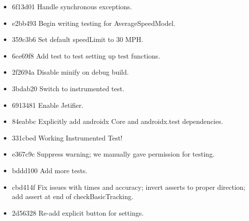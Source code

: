 \documentclass[11pt, a4paper, notitlepage]{report}
\begin{document}
\begin{itemize}
	\item 6f13d01 Handle synchronous exceptions. 
	\item e2bb493 Begin writing testing for AverageSpeedModel. 
	\item 359c3b6 Set default speedLimit to 30 MPH. 
	\item 6ce69f8 Add test to test setting up test functions. 
	\item 2f2694a Disable minify on debug build. 
	\item 3bdab20 Switch to instrumented test. 
	\item 6913481 Enable Jetifier. 
	\item 84eabbc Explicitly add androidx Core and androidx.test dependencies. 
	\item 331cbed Working Instrumented Test! 
	\item e367c9c Suppress warning; we manually gave permission for testing. 
	\item bddd100 Add more tests. 
	\item cbd414f Fix issues with times and accuracy; invert asserts to proper direction; add assert at end of checkBasicTracking. 
	\item 2d56328 Re-add explicit button for settings.
\end{itemize}


\end{document}
